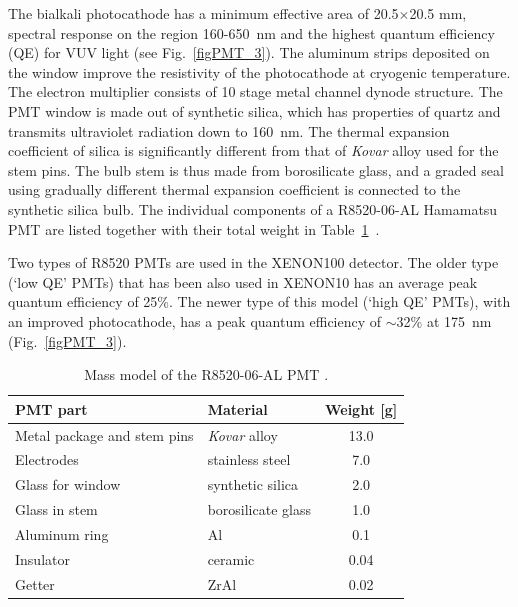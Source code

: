 The bialkali photocathode has a minimum effective area of 20.5$\times$20.5 mm, spectral response on the region 160-650~nm and the highest quantum efficiency (QE) for VUV light (see Fig.~\ref{figPMT_3}). The aluminum strips deposited on the window improve the resistivity of the photocathode at cryogenic temperature. The electron multiplier consists of 10 stage metal channel dynode structure. The PMT window is made out of synthetic silica, which has properties of quartz and transmits ultraviolet radiation down to 160~nm. The thermal expansion coefficient of silica is significantly different from that of {\it Kovar} alloy used for the stem pins. The bulb stem is thus made from borosilicate glass, and a graded seal using gradually different thermal expansion coefficient is connected to the synthetic silica bulb. 
The individual components of a R8520-06-AL Hamamatsu PMT are listed together with their total weight in Table~\ref{tabPMTmassModel}~\cite{PMTmassModel}.

Two types of R8520 PMTs are used in the XENON100 detector. The older type (`low QE' PMTs)  that has been also used in XENON10 has an average peak quantum efficiency of 25\%. The newer type of this model (`high QE' PMTs), with an improved photocathode, has a peak quantum efficiency of $\sim$32\% at 175~nm (Fig.~\ref{figPMT_3}).


\begin{table}[!h]
\centering
\caption[Mass model of the R8520-06-AL PMT]{Mass model of the R8520-06-AL PMT \cite{PMTmassModel}.}
\label{tabPMTmassModel}
\begin{tabular}{>{\footnotesize}l|>{\footnotesize}l|>{\footnotesize}c}
\hline
PMT part 					& Material				& Weight [g] \\
\hline
Metal package and stem pins	& {\it Kovar} alloy 		& 13.0	\\
Electrodes				& stainless steel 		& 7.0 \\
Glass for window			& synthetic silica		& 2.0 \\
Glass in stem				& borosilicate glass		& 1.0 \\
Aluminum ring				& Al 					& 0.1	 \\
Insulator					& ceramic				& 0.04 \\
Getter					& ZrAl				& 0.02 \\
\hline
\end{tabular}
\end{table}

